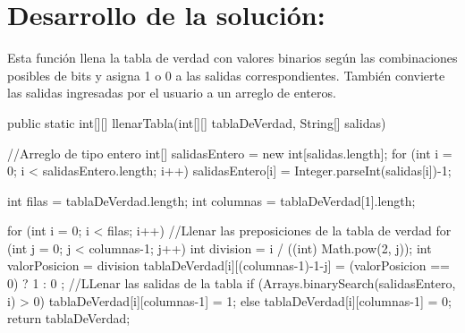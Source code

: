 \documentclass{IEEEcsmag}
\begin{document}
\section*{Desarrollo de la solución:}
Esta función llena la tabla de verdad con valores binarios según las combinaciones posibles de bits y asigna 1 o 0 a las salidas correspondientes. También convierte las salidas ingresadas por el usuario a un arreglo de enteros.
\begin{javaCode}
public static int[][] llenarTabla(int[][] tablaDeVerdad, String[] salidas){
    //Arreglo de tipo entero
    int[] salidasEntero = new int[salidas.length];
    for (int i = 0; i < salidasEntero.length; i++) {
        salidasEntero[i] = Integer.parseInt(salidas[i])-1;
    }
    
    int filas = tablaDeVerdad.length;
    int columnas = tablaDeVerdad[1].length;
    
    for (int i = 0; i < filas; i++) {
        //Llenar las preposiciones de la tabla de verdad
        for (int j = 0; j < columnas-1; j++) {
            int division = i / ((int) Math.pow(2, j));
            int valorPosicion = division %
            tablaDeVerdad[i][(columnas-1)-1-j] = (valorPosicion == 0)   ?   1 : 0 ;
        }
        //LLenar las salidas de la tabla
        if (Arrays.binarySearch(salidasEntero, i) > 0) {
            tablaDeVerdad[i][columnas-1] = 1;
        } else {
            tablaDeVerdad[i][columnas-1] = 0;
        }
    }
    return tablaDeVerdad;
}
\end{javaCode}
\end{document}
